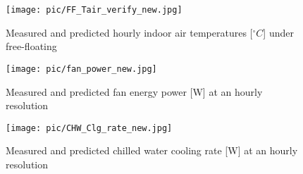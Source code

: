 \documentclass[3p,times,12pt]{elsarticle}
\begin{document}
\begin{sloppypar}
\begin{appendices}
\setcounter{figure}{0} 

\renewcommand{\figurename}{Figure}
\renewcommand{\thefigure}{A\arabic{figure}}

\begin{figure}[H]
\centering\texttt{[image: pic/FF\_Tair\_verify\_new.jpg]}
\caption{Measured and predicted hourly indoor air temperatures [$ ^\circ C $] under free-floating}
\label{fig:temperature}
\end{figure}

\begin{figure}
\centering\texttt{[image: pic/fan\_power\_new.jpg]}
\caption{Measured and predicted fan energy power [W] at an hourly resolution}
\label{fig:fan_power}
\end{figure}

\begin{figure}
\centering\texttt{[image: pic/CHW\_Clg\_rate\_new.jpg]}
\caption{Measured and predicted chilled water cooling rate [W] at an hourly resolution}
\label{fig:cooling_rate}
\end{figure}

\end{appendices}


\end{sloppypar}
\end{document}
